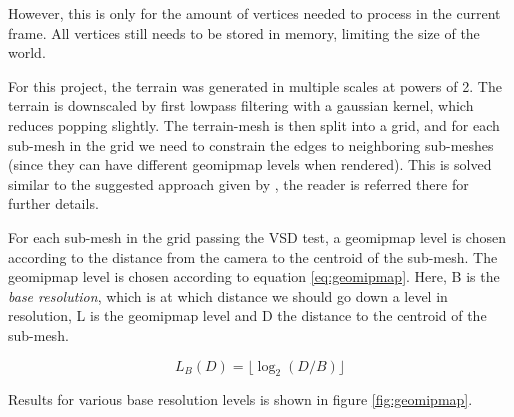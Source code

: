 \documentclass{article}
\begin{document}
However, this is only for the amount of vertices needed to process in the current frame. All vertices still needs to be stored in memory, limiting the size of the world.

For this project, the terrain was generated in multiple scales at powers of 2. The terrain is downscaled by first lowpass filtering with a gaussian kernel, which reduces popping slightly. 
The terrain-mesh is then split into a grid, and for each sub-mesh in the grid we need to constrain the edges to neighboring sub-meshes (since they can have different geomipmap levels when rendered). This is solved similar to the suggested approach given by \cite[13,p.~177]{ingemar}, the reader is referred there for further details.

For each sub-mesh in the grid passing the VSD test, a geomipmap level is chosen according to the distance from the camera to the centroid of the sub-mesh. The geomipmap level is chosen according to equation \ref{eq:geomipmap}. Here, B is the \emph{base resolution}, which is at which distance we should go down a level in resolution, L is the geomipmap level and D the distance to the centroid of the sub-mesh.

\begin{equation}\label{eq:geomipmap}
    L_B(D) = \lfloor \log_2(D / B) \rfloor
\end{equation}

Results for various base resolution levels is shown in figure \ref{fig:geomipmap}.
\end{document}
